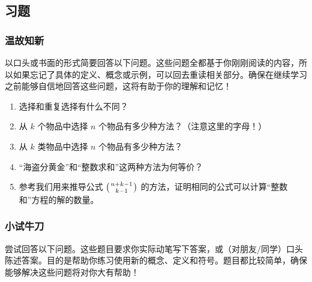 
\subsection{习题}

\subsubsection*{温故知新}

以口头或书面的形式简要回答以下问题。这些问题全都基于你刚刚阅读的内容，所以如果忘记了具体的定义、概念或示例，可以回去重读相关部分。确保在继续学习之前能够自信地回答这些问题，这将有助于你的理解和记忆！

\begin{enumerate}[label=(\arabic*)]
    \item 选择和重复选择有什么不同？
    \item 从 $k$ 个物品中选择 $n$ 个物品有多少种方法？（注意这里的字母！）
    \item 从 $k$ 类物品中选择 $n$ 个物品有多少种方法？
    \item ``海盗分黄金''和``整数求和''这两种方法为何等价？
    \item 参考我们用来推导公式 $\big({n+k-1 \atop k-1}\big)$ 的方法，证明相同的公式可以计算``整数和''方程的解的数量。
\end{enumerate}

\subsubsection*{小试牛刀}

尝试回答以下问题。这些题目要求你实际动笔写下答案，或（对朋友/同学）口头陈述答案。目的是帮助你练习使用新的概念、定义和符号。题目都比较简单，确保能够解决这些问题将对你大有帮助！

